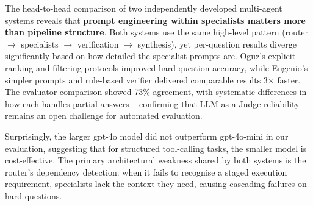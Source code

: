 \documentclass[conference]{IEEEtran}
\begin{document}
The head-to-head comparison of two independently developed multi-agent systems reveals
that \textbf{prompt engineering within specialists matters more than pipeline structure}.
Both systems use the same high-level pattern (router $\to$ specialists $\to$ verification
$\to$ synthesis), yet per-question results diverge significantly based on how detailed
the specialist prompts are.  Oguz's explicit ranking and filtering protocols improved
hard-question accuracy, while Eugenio's simpler prompts and rule-based verifier delivered
comparable results 3$\times$ faster.  The evaluator comparison showed 73\% agreement,
with systematic differences in how each handles partial answers -- confirming that
LLM-as-a-Judge reliability remains an open challenge for automated evaluation.

Surprisingly, the larger gpt-4o model did not outperform gpt-4o-mini in our evaluation,
suggesting that for structured tool-calling tasks, the smaller model is cost-effective.
The primary architectural weakness shared by both systems is the router's dependency
detection: when it fails to recognise a staged execution requirement, specialists lack
the context they need, causing cascading failures on hard questions.
\end{document}
